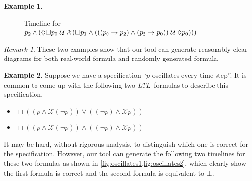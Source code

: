 \documentclass[conference]{IEEEtran}
\theoremstyle{definition}
\newtheorem{example}{Example}[section]
\theoremstyle{remark}
\newtheorem{remark}{Remark}[section]
\newcommand{\always}{\Box}
\newcommand{\eventually}{\Diamond}
\newcommand{\nextt}{\mathcal{X}}
\newcommand{\limplies}{\rightarrow}
\newcommand{\ltl}{\textit{LTL}}
\newcommand{\stronguntil}{\hspace{0.1cm} \mathcal{U}  \hspace{0.1cm}}
\begin{document}
\begin{example}
\begin{figure}[h!]
        \caption{Timeline for $p_2 \land (\eventually \always p_0 \stronguntil \nextt(\always p_1 \land (((p_0 \limplies p_2) \land (p_2 \limplies p_0)) \stronguntil \eventually p_0)))$}
        \label{fig:ex13}
    \end{figure}
\end{example}
\begin{remark}
    These two examples show that our tool can generate reasonably clear diagrams for both real-world formula and randomly generated formula.
\end{remark}

\begin{example}
  Suppose we have a specification ``$p$ oscillates every time step''. It is common to come up with the following two \ltl\ formulas to describe this specification.
  \begin{itemize}
    \item $\always ((p \land \nextt (\lnot p)) \lor ((\lnot p) \land \nextt p))$
    \item $\always ((p \land \nextt (\lnot p)) \land ((\lnot p) \land \nextt p))$
  \end{itemize}
  It may be hard, without rigorous analysis, to distinguish which one is correct for the specification. However, our tool can generate the following two timelines for these two formulas as shown in \cref{fig:oscillates1,fig:oscillates2}, which clearly show the first formula is correct and the second formula is equivalent to $\bot$.
\begin{figure}[!h]
  \centering
\end{figure}
\end{example}
\end{document}
